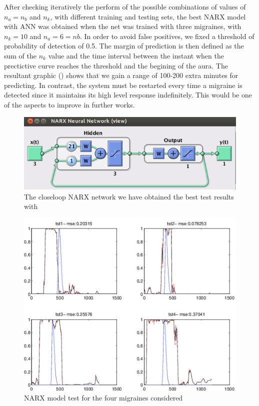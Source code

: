 After checking iteratively the perform  
of the possible combinations of values of 
$n_{a}=n_{b}$ and $n_{k}$, with different training and testing
sets, the best NARX model with ANN was obtained when the net was 
trained with three migraines, with $n_{k}=10$ and $n_{a}=6=n{b}$.
In order to avoid false positives, we fixed a threshold 
of probability of detection of 0.5. The margin of prediction is then 
defined as the sum of the $n_{k}$ value and the time interval 
between the instant when the prectictive curve reaches the threshold 
and the begining of the aura. The resultant graphic 
()
shows that we gain a range of 100-200 extra
minutes for predicting. In contrast, the system must be restarted
every time a migraine is detected since it maintains its high level 
response indefinitely. This would be one of the aspects to improve 
in further works.



\begin{figure}[!ht]
\centering
\includegraphics[width=0.9\columnwidth]{images/results/narxCloseloop}
\caption{The closeloop NARX network we have obtained the best test results with}
\label{fig:narxcloseloop}
\end{figure}




\begin{figure}
\centering
\includegraphics[width=\columnwidth]{images/results/narx_sinEDA_trn3_na-nb1-nk10_NN1}
\caption{NARX model test for the four migraines considered}
\label{fig:narxTest}
\end{figure}
